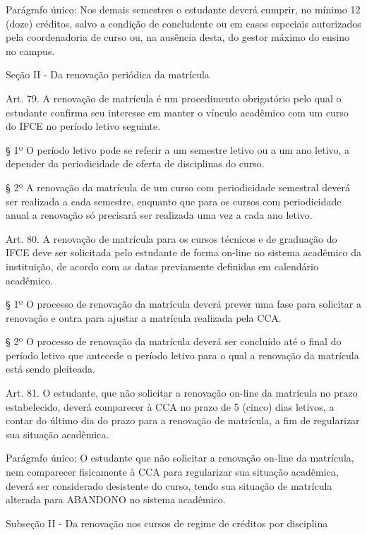{Parágrafo único: Nos demais semestres o estudante deverá cumprir, no mínimo 12 (doze) créditos, salvo a condição de concludente ou em casos especiais autorizados pela coordenadoria de curso ou, na ausência desta, do gestor máximo do ensino no campus.

\begin{center}
	Seção II - Da renovação periódica da matrícula
\end{center}

Art. 79. A renovação de matrícula é um procedimento obrigatório pelo qual o estudante confirma seu interesse em manter o vínculo acadêmico com um curso do IFCE no período letivo seguinte.

§ 1º O período letivo pode se referir a um semestre letivo ou a um ano letivo, a depender da periodicidade de oferta de disciplinas do curso.

§ 2º A renovação da matrícula de um curso com periodicidade semestral deverá ser realizada a cada semestre, enquanto que para os cursos com periodicidade anual a renovação só precisará ser realizada uma vez a cada ano letivo.

Art. 80. A renovação de matrícula para os cursos técnicos e de graduação do IFCE deve ser solicitada pelo estudante de forma on-line no sistema acadêmico da instituição, de acordo com as datas previamente definidas em calendário acadêmico.

§ 1º O processo de renovação da matrícula deverá prever uma fase para solicitar a renovação e outra para ajustar a matrícula realizada pela CCA.

§ 2º O processo de renovação da matrícula deverá ser concluído até o final do período letivo que antecede o período letivo para o qual a renovação da matrícula está sendo pleiteada.

Art. 81. O estudante, que não solicitar a renovação on-line da matrícula no prazo estabelecido, deverá comparecer à CCA no prazo de 5 (cinco) dias letivos, a contar do último dia do prazo para a renovação de matrícula, a fim de regularizar sua situação acadêmica.

Parágrafo único: O estudante que não solicitar a renovação on-line da matrícula, nem comparecer fisicamente à CCA para regularizar sua situação acadêmica, deverá ser considerado desistente do curso, tendo sua situação de matrícula alterada para ABANDONO no sistema acadêmico.

\begin{center}
	Subseção II - Da renovação nos cursos de regime de créditos por disciplina
\end{center}

}
